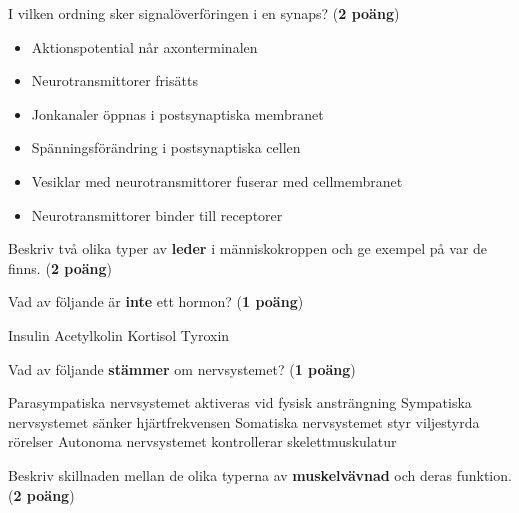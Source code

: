 \documentclass{exam}
\begin{document}
\vspace{5mm} %
\begin{center}
\end{center}
\begin{questions}

\question I vilken ordning sker signalöverföringen i en synaps? (\textbf{2 poäng})

\begin{itemize}
  \item Aktionspotential når axonterminalen
  \item Neurotransmittorer frisätts
  \item Jonkanaler öppnas i postsynaptiska membranet
  \item Spänningsförändring i postsynaptiska cellen
  \item Vesiklar med neurotransmittorer fuserar med cellmembranet
  \item Neurotransmittorer binder till receptorer
\end{itemize}

\vspace{5mm} %

\question Beskriv två olika typer av \textbf{leder} i människokroppen och ge exempel på var de finns. (\textbf{2 poäng})
\vspace{40mm}

\question Vad av följande är \textbf{inte} ett hormon? (\textbf{1 poäng})
\begin{checkboxes}
    \choice Insulin
    \choice Acetylkolin
    \choice Kortisol
    \choice Tyroxin
\end{checkboxes}

\vspace{5mm}
\question Vad av följande \textbf{stämmer} om nervsystemet? (\textbf{1 poäng})
\begin{checkboxes}
    \choice Parasympatiska nervsystemet aktiveras vid fysisk ansträngning
    \choice Sympatiska nervsystemet sänker hjärtfrekvensen
    \choice Somatiska nervsystemet styr viljestyrda rörelser
    \choice Autonoma nervsystemet kontrollerar skelettmuskulatur
\end{checkboxes}
\break

\question Beskriv skillnaden mellan de olika typerna av \textbf{muskelvävnad} och deras funktion. (\textbf{2 poäng})
\vspace{40mm}


\end{questions}
\end{document}
